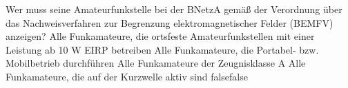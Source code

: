     {Wer muss seine Amateurfunkstelle bei der BNetzA gemäß der Verordnung über das Nachweisverfahren zur Begrenzung elektromagnetischer Felder (BEMFV) anzeigen?}
    {Alle Funkamateure, die ortsfeste Amateurfunkstellen mit einer Leistung ab 10 W EIRP betreiben}
    {Alle Funkamateure, die Portabel- bzw. Mobilbetrieb durchführen}
    {Alle Funkamateure der Zeugnisklasse A}
    {Alle Funkamateure, die auf der Kurzwelle aktiv sind}
    {false}{false}